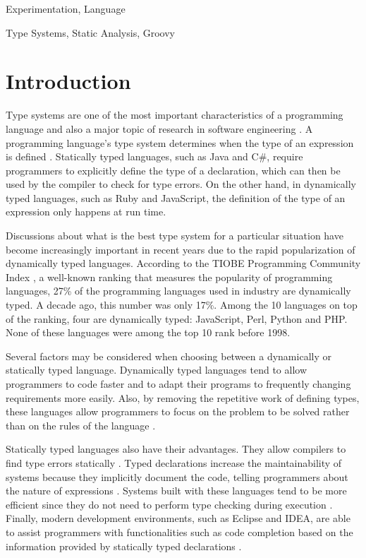 \documentclass[]{sigplanconf}
\begin{document}

\terms
Experimentation, Language

\keywords
Type Systems, Static Analysis, Groovy

\section{Introduction}
Type systems are one of the most important characteristics of a programming language and also a major topic of research in software engineering \cite{Furr09,takikawa12,types_and_programming_languages,gradual_typing}.
A programming language's type system determines when the type of an expression is defined \cite{types_and_programming_languages}. 
Statically typed languages, such as Java and C\#, require programmers to explicitly define the type of a declaration, which can then be used by the compiler to check for type errors. 
On the other hand, in dynamically typed languages, such as Ruby and JavaScript, the definition of the type of an expression only happens at run time.

Discussions about what is the best type system for a particular situation have become increasingly important in recent years due to the rapid popularization of dynamically typed languages. 
According to the TIOBE Programming Community Index \cite{tiobe}, a well-known ranking that measures the popularity of programming languages, 27\% of the programming languages used in industry are dynamically typed. 
A decade ago, this number was only 17\%. 
Among the 10 languages on top of the ranking, four are dynamically typed: JavaScript, Perl, Python and PHP. 
None of these languages were among the top 10 rank before 1998.

Several factors may be considered when choosing between a dynamically or statically typed language. 
Dynamically typed languages tend to allow programmers to code faster and to adapt their programs to frequently changing requirements more easily.
Also, by removing the repetitive work of defining types, these languages allow programmers to focus on the problem to be solved rather than on the rules of the language \cite{dynamically_typed_languages}.

Statically typed languages also have their advantages. 
They allow compilers to find type errors statically \cite{should_your_specification_language_be_typed}. 
Typed declarations increase the maintainability of systems because they implicitly document the code, telling programmers about the nature of expressions \cite{type_systems,mayer2012static}. 
Systems built with these languages tend to be more efficient since they do not need to perform type checking during execution \cite{bruce2002foundations,jit}. 
Finally, modern development environments, such as Eclipse and IDEA, are able to assist programmers with functionalities such as code completion based on the information provided by statically typed declarations \cite{bruch2009learning}.
\end{document}
